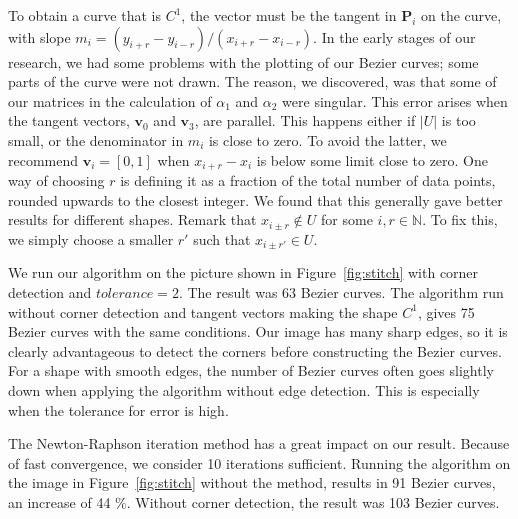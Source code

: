 \documentclass[10pt]{article}
\begin{document}
To obtain a curve that is $C^1$, the vector must be the tangent in $\mathbf{P}_i$ on the curve, with slope $m_i = (y_{i+r} - y_{i-r})/(x_{i+r} - x_{i-r})$. In the early stages of our research, we had some problems with the plotting of our Bezier curves; some parts of the curve were not drawn. The reason, we discovered, was that some of our matrices in the calculation of $\alpha_1$ and $\alpha_2$ were singular. This error arises when the tangent vectors, $\mathbf{v}_0$ and $\mathbf{v}_3$, are parallel. This happens either if $|U|$ is too small, or the denominator in $m_i$ is close to zero. To avoid the latter, we recommend $\mathbf{v}_i = [0,1]$ when $x_{i+r} - x_i$ is below some limit close to zero. One way of choosing $r$ is defining it as a fraction of the total number of data points, rounded upwards to the closest integer. We found that this generally gave better results for different shapes. Remark that $x_{i\pm r} \notin U$ for some $i,r \in \mathbb{N}$. To fix this, we simply choose a smaller $r'$  such that $x_{i\pm r'} \in U$.


We run our algorithm on the picture shown in Figure~\ref{fig:stitch} with corner detection and $tolerance = 2$. The result was 63 Bezier curves. The algorithm run without corner detection and tangent vectors making the shape $C^1$, gives 75 Bezier curves with the same conditions. Our image has many sharp edges, so it is clearly advantageous to detect the corners before constructing the Bezier curves. For a shape with smooth edges, the number of Bezier curves often goes slightly down when applying the algorithm without edge detection. This is especially when the tolerance for error is high. 

The Newton-Raphson iteration method has a great impact on our result. Because of fast convergence, we consider 10 iterations sufficient. Running the algorithm on the image in Figure~\ref{fig:stitch} without the method, results in 91 Bezier curves, an increase of 44 $\%$. Without corner detection, the result was 103 Bezier curves. 
\end{document}
